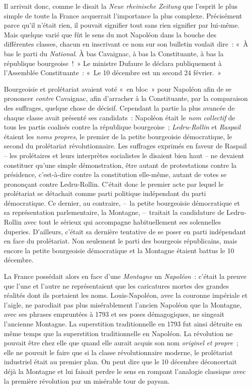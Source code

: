 \documentclass[twoside]{book} %
\begin{document}
Il arrivait donc, comme le disait la \emph{Neue rheinische Zeitung} que l’esprit le plus simple de toute la France acquerrait l’importance la plus complexe. Précisément parce qu’il n’était rien, il pouvait signifier tout sans rien signifier par lui-même. Mais quelque varié que fût le sens du mot Napoléon dans la bouche des différentes classes, chacun en inscrivant ce nom sur son bulletin voulait dire : « À bas le parti du \emph{National}. À bas Cavaignac, à bas la Constituante, à bas la république bourgeoise ! » Le ministre Dufaure le déclara publiquement à l’Assemblée Constituante : « Le 10 décembre est un second 24 février. »\par
Bourgeoisie et prolétariat avaient voté « en bloc » pour Napoléon afin de se prononcer \emph{contre} Cavaignac, afin d’arracher à la Constituante, par la comparaison des suffrages, quelque chose de décisif. Cependant la partie la plus avancée de chaque classe avait présenté ses candidats : Napoléon était le \emph{nom collectif} de tous les partis coalisés contre la république bourgeoise ; \emph{Ledru-Rollin} et \emph{Raspail} étaient les \emph{noms propres}, le premier de la petite bourgeoisie démocratique, le second du prolétariat révolutionnaire. Les suffrages exprimés en faveur de Raspail – les prolétaires et leurs interprètes socialistes le disaient bien haut – ne devaient constituer qu’une simple démonstration, être autant de protestations contre la présidence, c’est-à-dire contre la constitution elle-même, autant de votes se prononçant contre Ledru-Rollin. C’était donc le premier acte par lequel le prolétariat se détachait comme parti politique indépendant du parti démocratique. Ce dernier, au contraire, – la petite bourgeoisie démocratique et sa représentation parlementaire, la Montagne, – traitait la candidature de Ledru-Rollin avec tout le sérieux qui accompagne habituellement ses solennelles duperies. D’ailleurs, c’était sa dernière tentative de se poser en parti indépendant en face du prolétariat. Non seulement le parti des bourgeois républicains, mais encore la petite bourgeoisie démocratique et la Montagne étaient battus le 10 décembre.\par
La France possédait alors en face d’une \emph{Montagne} un \emph{Napoléon} : c’était la preuve que l’une et l’autre ne représentaient que les caricatures mortes des grandes réalités dont ils portaient les noms. Louis-Napoléon, avec la couronne impériale et l’aigle, ne parodiait pas plus misérablement l’ancien Napoléon que la Montagne, avec ses phrases empruntées à 1793 et ses poses démagogiques, ne singeait l’ancienne Montagne. La superstition traditionnelle en 1793 fut ainsi détruite en même temps que la superstition traditionnelle en Napoléon. La révolution ne pouvait être chez elle que quand elle aurait acquis son nom \emph{originel et propre} ; elle ne pouvait le faire que si la classe révolutionnaire moderne, le prolétariat industriel était au premier plan. On peut dire que le 10 décembre déconcertait déjà la Montagne et lui faisait perdre le sens en rompant l’analogie classique avec la première révolution par un misérable tour de paysan.\par
\end{document}

